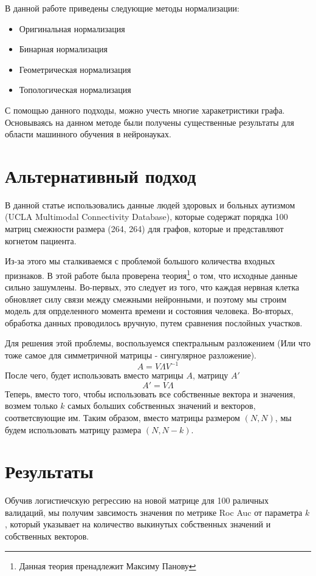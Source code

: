 \documentclass{urticle}
\begin{document}
В данной работе приведены следующие методы нормализации:
\begin{itemize}
	\item Оригинальная нормализация
	\item Бинарная нормализация
	\item Геометрическая нормализация
	\item Топологическая нормализация			
\end{itemize}

С помощью данного подходы, можно учесть многие харакетристики графа. Основываясь на данном методе были получены существенные результаты\cite{article1} для области машинного обучения в нейронауках.

\section*{Альтернативный подход}
В данной статье использовались данные людей здоровых и больных аутизмом (UCLA Multimodal Connectivity Database), которые содержат порядка 100 матриц смежности размера (264, 264) для графов, которые и представляют когнетом пациента.

Из-за этого мы сталкиваемся с проблемой большого количества входных признаков. В этой работе была проверена теория\footnote{Данная теория пренадлежит Максиму Панову} о том, что исходные данные сильно зашумлены. Во-первых, это следует из того, что каждая нервная клетка обновляет силу связи между смежными нейронными, и поэтому мы строим модель для опрделенного момента времени и состояния человека. Во-вторых, обработка данных проводилось вручную, путем сравнения послойных участков.

Для решения этой проблемы, воспользуемся спектральным разложением (Или что тоже самое для симметричной матрицы - сингулярное разложение). 
$$ A = V \Lambda {V}^{-1} $$
После чего, будет использовать вместо матрицы $A$, матрицу $A'$
$$ A' = V \Lambda $$
Теперь, вместо того, чтобы использовать все собственные вектора и значения, возмем только $k$ самых больших собственных значений и векторов, соответсвующие им. Таким образом, вместо матрицы размером $(N, N)$, мы будем использовать матрицу размера $(N, N-k)$.

\section*{Результаты}
Обучив логистиечскую регрессию на новой матрице для 100 раличных валидаций, мы получим завсимость значения по метрике Roc Auc от параметра $k$, который указывает на количество выкинутых собственных значений и собственных векторов.
\end{document}
